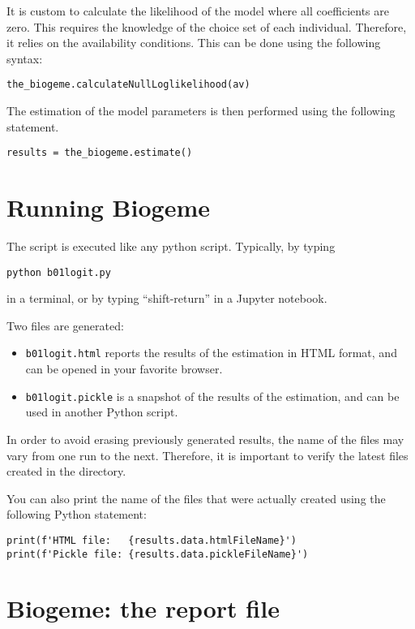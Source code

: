 \documentclass[12pt,a4paper]{article}
\begin{document}
It is custom to calculate the likelihood of the model where all coefficients are zero. This requires the knowledge of the choice set of each individual. Therefore, it relies on the availability conditions. This can be done using the following syntax:

\begin{lstlisting}
the_biogeme.calculateNullLoglikelihood(av)
\end{lstlisting}

The estimation of the model parameters is then performed using the
following statement. 

\begin{lstlisting}
results = the_biogeme.estimate()
\end{lstlisting}


\section{Running Biogeme}

The script is executed like any python script. Typically, by typing
\begin{lstlisting}
python b01logit.py
\end{lstlisting}
in a terminal, or by typing ``shift-return'' in a Jupyter notebook.

Two files are generated:
\begin{itemize}
\item \lstinline+b01logit.html+ reports the results of the estimation
  in HTML format, and can be opened in your favorite browser. 
\item \lstinline+b01logit.pickle+ is a snapshot of the results of the
estimation, and can be used in another Python script. 
\end{itemize}

In order to avoid erasing previously generated results, the name of
the files may vary from one run to the next. Therefore,
it is important to verify the latest files created in the directory. 

You can also print the name of the files that were actually
created using the following Python statement:
\begin{lstlisting}
print(f'HTML file:   {results.data.htmlFileName}')
print(f'Pickle file: {results.data.pickleFileName}')
\end{lstlisting}
\clearpage

\section{Biogeme: the report file}
\label{sec:pythonreport}
\end{document}
